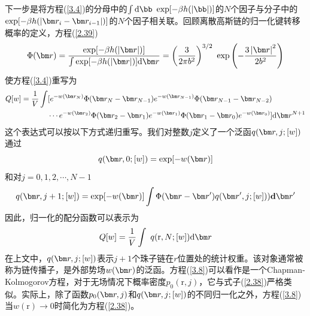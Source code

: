 下一步是将方程(\ref{3.4})的分母中的$\int\mathrm{d}\bb~\exp[-\beta h(\left|\bb\right|)]$的$N$个因子与分子中的$\exp[-\beta h(\left|\br_i-\br_{i-1}\right|)]$的$N$个因子相关联。回顾离散高斯链的归一化键转移概率的定义，方程(\ref{2.39})
\begin{equation}\label{3.5}
\Phi(\br)=\frac{\exp[-\beta h(\left|\br\right|)]}{\int\exp[-\beta h(\left|\br\right|)]\mathrm{d}\br}=\left(\frac{3}{2\pi b^2}\right)^{3/2}~\exp\left(-\frac{3\left|\br\right|^2}{2b^2}\right)
\end{equation}
使方程(\ref{3.4})重写为
\begin{equation}\label{3.6}
\begin{aligned}
Q[w]=\frac{1}{V}\int&[e^{-w(\br_N)}\Phi(\br_N-\br_{N-1})e^{-w(\br_{N-1})}\Phi(\br_{N-1}-\br_{N-2})\\
&\cdots e^{-w(\br_2)}\Phi(\br_2-\br_1)e^{-w(\br_1)}\Phi(\br_1-\br_0)e^{-w(\br_0)}]\mathrm{d}\br^{N+1}
\end{aligned}
\end{equation}
这个表达式可以按以下方式递归重写。我们对整数$j$定义了一个泛函$q(\br,j;[w])$通过
\begin{equation}\label{3.7}
q(\br,0;[w])=\exp[-w(\br)]
\end{equation}
和对$j=0,1,2,\cdots,N-1$
\begin{equation}\label{3.8}
q(\br,j+1;[w])=\exp[-w(\br)]\int\Phi(\br-\br')q(\br',j;[w]))\mathbf{d}\br'
\end{equation}
因此，归一化的配分函数可以表示为
\begin{equation}\label{3.9}
Q[w]=\frac{1}{V}\int~q(\mathrm{r},N;[w])\mathrm{d}\br
\end{equation}
在上文中，$q(\br,j;[w])$表示$j+1$个珠子链在$r$位置处的统计权重。该对象通常被称为链传播子，是外部势场$w(\br)$的泛函。方程(\ref{3.8})可以看作是一个Chapman-Kolmogorov方程，对于无场情况下概率密度$p_0(\mathrm{r},j)$，它与式子(\ref{2.38})严格类似。实际上，除了函数$p_0(\br,j)$和$q(\br,j;[w])$的不同归一化之外，方程(\ref{3.8})当$w(\mathrm{r})\rightarrow 0$时简化为方程(\ref{2.38})。

